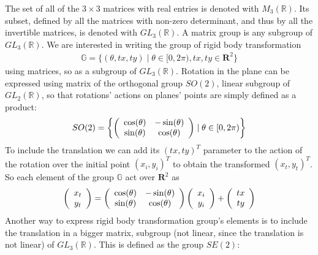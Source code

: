 The set of all of the $3\times 3$  matrices with real entries is denoted with $M_{3}(\mathbb{R})$. 
Its subset, defined by all the matrices with non-zero determinant, and thus by all the invertible matrices, is denoted with $GL_3 (\mathbb{R})$. A matrix group is any subgroup of  $GL_3 (\mathbb{R})$.
We are interested in writing the group of rigid body transformation 
\begin{align*}
\mathbb{G} =
\{ (\theta, tx, ty) \mid \theta \in [0, 2\pi),   tx, ty \in\mathbf{R}^2  \}
\end{align*}
using matrices, so as a subgroup of $GL_3 (\mathbb{R})$.
Rotation in the plane can be expressed using matrix of the orthogonal group $SO(2)$, linear subgroup of $GL_2 (\mathbb{R})$, so that rotations' actions on planes' points are simply defined as a product: 
\begin{align*}
SO(2) = 
\left \{
\left (
\begin{array} {c c }
\cos(\theta) & - \sin(\theta) \\
\sin(\theta) & \cos(\theta) 
\end{array}
\right )
\mid
\theta \in  [0, 2\pi)
\right \}
\end{align*}
To include the translation we can add its $(tx, ty)^{T}$ parameter to the action of the rotation over the initial point $(x_{i}, y_{i})^{T}$ to obtain the transformed $(x_{t}, y_{t})^{T}$. So each element of the group $\mathbb{G}$ act over $\mathbf{R}^2$ as
\begin{align*}
\left (  
\begin{array} {c }
x_{t} \\
y_{t}
\end{array}
\right ) 
= 
\left (
\begin{array} {c c }
\cos(\theta) & - \sin(\theta) \\
\sin(\theta) & \cos(\theta) 
\end{array}
\right )
\left (  
\begin{array} {c }
x_{i} \\
y_{i}
\end{array}
\right ) 
+
\left (  
\begin{array} {c }
tx \\
ty
\end{array}
\right ) 
\end{align*}
Another way to express rigid body transformation group's elements is to include the translation in a bigger matrix, subgroup (not linear, since the translation is not linear) of $GL_3 (\mathbb{R})$. This is defined as the group $SE(2)$:

